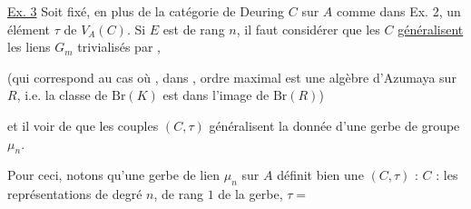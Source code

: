 
\uline{Ex. 3} Soit fixé, en plus de la catégorie de
Deuring $C$ sur $A$ comme dans Ex. 2, un
élément $\tau$ de $V_A(C)$. Si $E$ est  de rang $n$,
il faut considérer que les $C$ \uline{généralisent} les 
 liens $G_m$  trivialisés par ,

(qui correspond au cas où , dans , ordre maximal est 
une algèbre d'Azumaya sur $R$, i.e. la classe de  $\mathrm{Br}(K)$ est dans
l'image de $\mathrm{Br}(R)$)



et il  voir de  que les couples $(C,\tau)$
généralisent la donnée d'une gerbe de groupe $\mu_n$.

Pour ceci,  notons  qu'une
gerbe de lien $\mu_n$ sur $A$ définit bien une $(C,\tau)$ :
$C$ : les  représentations de degré $n$, de rang $1$
de la gerbe, $\tau=$ 

